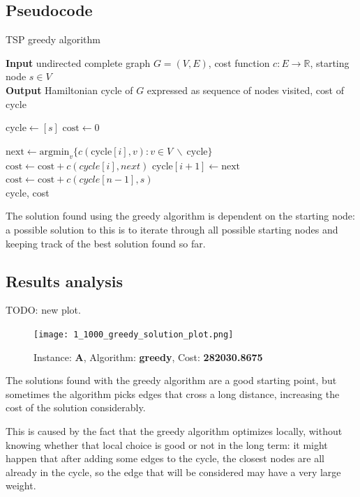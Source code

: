 \subsection{Pseudocode}
\begin{algorithm}[h]
    \caption{TSP greedy algorithm}
    \hspace*{\algorithmicindent} \textbf{Input} undirected complete graph $G=(V,E)$, cost function $c:E\rightarrow\mathbb{R}$, starting node $s\in V$\\
    \hspace*{\algorithmicindent} \textbf{Output} Hamiltonian cycle of $G$ expressed as sequence of nodes visited, cost of cycle\\
    \begin{algorithmic}

        \State $\mbox{cycle} \gets [s]$
        \State $\mbox{cost} \gets 0$
        
            \State $\mbox{next}\gets\mbox{argmin}_v\{c(\mbox{cycle}[i],v) : v\in V \ \backslash \ \mbox{cycle}\}$
            \State $\mbox{cost}\gets\mbox{cost}+c(cycle[i], next)$
            \State $\mbox{cycle}[i+1]\gets\mbox{next}$
        \EndFor
        \State $\mbox{cost}\gets\mbox{cost}+c(cycle[n-1],s)$\\
        \Return cycle, cost
    \end{algorithmic}
\end{algorithm}
\FloatBarrier

The solution found using the greedy algorithm is dependent on the starting node: a possible solution to this is to iterate through all possible starting nodes and keeping track of the best solution found so far.

\subsection{Results analysis}
TODO: new plot.
\begin{figure}[h]
    \centering
    \texttt{[image: 1\_1000\_greedy\_solution\_plot.png]}
    \caption*{Instance: \textbf{A}, Algorithm: \textbf{greedy}, Cost: \textbf{282030.8675}}
\end{figure}

The solutions found with the greedy algorithm are a good starting point, but sometimes the algorithm picks edges that cross a long distance, increasing the cost of the solution considerably.

This is caused by the fact that the greedy algorithm optimizes locally, without knowing whether that local choice is good or not in the long term: it might happen that after adding some edges to the cycle, the closest nodes are all already in the cycle, so the edge that will be considered may have a very large weight.

